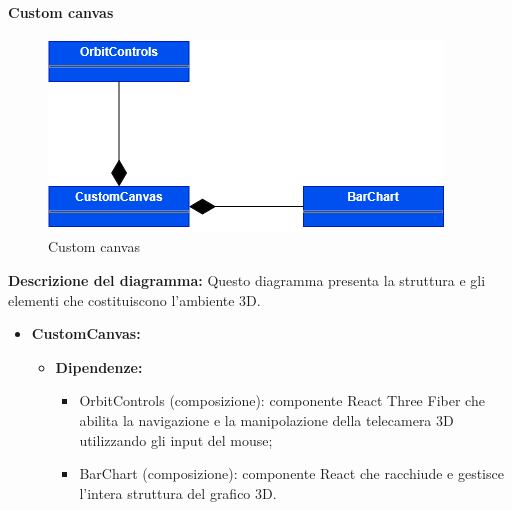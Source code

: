 \pagebreak

\paragraph{Custom canvas}
\begin{figure}[h!] \centering
    \includegraphics[scale=0.45]{template/images/uml_front/ui/customcanvas.png}
    \caption{Custom canvas}
\end{figure}
\textbf{Descrizione del diagramma:}
Questo diagramma presenta la struttura e gli elementi che costituiscono l'ambiente 3D.
\begin{itemize}
    \item \textbf{CustomCanvas:}
          \begin{itemize}
              \item \textbf{Dipendenze:}
                    \begin{itemize}
                        \item OrbitControls (composizione): componente React Three Fiber che abilita la
                              navigazione e la manipolazione della telecamera 3D utilizzando gli input del
                              mouse;
                        \item BarChart (composizione): componente React che racchiude e gestisce l'intera
                              struttura del grafico 3D.
                    \end{itemize}
          \end{itemize}
\end{itemize}

